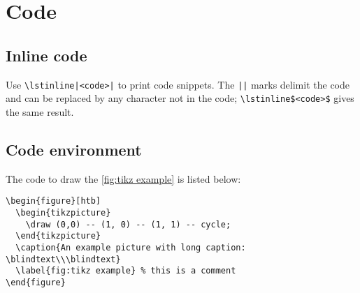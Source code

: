 \section{Code}

\subsection{Inline code}
Use \lstinline$\lstinline|<code>|$ to print code snippets. The \lstinline$||$ marks delimit
the code and can be replaced by any character not in the code;
\eg \lstinline|\lstinline$<code>$| gives the same result.

\subsection{Code environment}
The code to draw the \cref{fig:tikz example} is listed below:
\begin{lstlisting}[caption={\hologo{LaTeX} code for inserting a figure}]
\begin{figure}[htb]
  \begin{tikzpicture}
    \draw (0,0) -- (1, 0) -- (1, 1) -- cycle;
  \end{tikzpicture}
  \caption{An example picture with long caption: \blindtext\\\blindtext}
  \label{fig:tikz example} % this is a comment
\end{figure}
\end{lstlisting}
